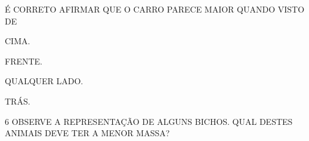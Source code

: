 É CORRETO AFIRMAR QUE O CARRO PARECE MAIOR QUANDO VISTO DE

\begin{multicols}{2}
\begin{escolha}
\item CIMA.

\item FRENTE.

\item QUALQUER LADO.

\item TRÁS.
\end{escolha}
\end{multicols}

\pagebreak
\num{6} OBSERVE A REPRESENTAÇÃO DE ALGUNS BICHOS.
QUAL DESTES ANIMAIS DEVE TER A MENOR MASSA?


